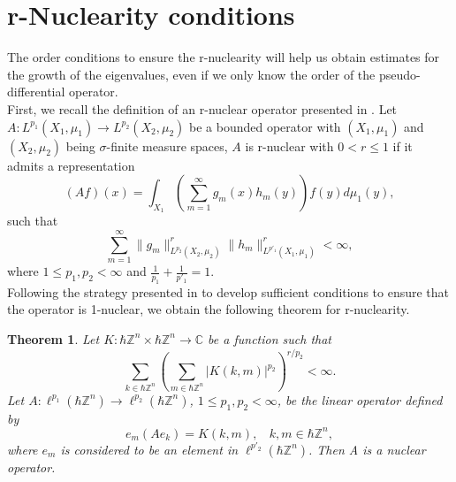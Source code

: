 \documentclass[pdflatex,sn-mathphys-num]{sn-jnl}%
\theoremstyle{thmstyleone}%
\newtheorem{theorem}{Theorem}
\theoremstyle{thmstyletwo}%
\theoremstyle{thmstylethree}%
\begin{document}
\section{r-Nuclearity conditions}\label{section nuclear}
The order conditions to ensure the r-nuclearity will help us obtain estimates for the growth of the eigenvalues, even if we only know the order of the pseudo-differential operator. \\
First, we recall the definition of an r-nuclear operator presented in \cite{delgado2015r}. Let $A:L^{p_1}(X_1,\mu_1)\to L^{p_2}(X_2,\mu_2)$ be a bounded operator with $(X_1,\mu_1)$ and $(X_2,\mu_2)$ being $\sigma$-finite measure spaces, $A$ is r-nuclear with $0<r\leq 1$ if it admits a representation 
\begin{equation}
    (Af)(x)=\int_{X_1}\left(\sum_{m=1}^{\infty} g_m(x)h_m(y) \right)f(y)d\mu_1(y), 
\end{equation}
such that 
\begin{equation}
    \sum_{m=1}^{\infty} \|g_m\|^r_{L^{p_2}(X_2,\mu_2)} \|h_m\|^r_{L^{p'_1}(X_1,\mu_1)}<\infty,
\end{equation}
where $1\leq p_1,p_2<\infty$ and $\frac{1}{p_1}+\frac{1}{p'_1}=1$.\\
\indent Following the strategy presented in \cite{delgado2013p} to develop sufficient conditions to ensure that the operator is 1-nuclear, we obtain the following theorem for r-nuclearity. 
\begin{theorem}
    Let $K:\hbar\mathbb{Z}^n\times \hbar\mathbb{Z}^n\to \mathbb{C}$ be a function such that 
    \[\sum_{k\in\hbar\mathbb{Z}^n}\left(\sum_{m\in\hbar\mathbb{Z}^n} |K(k,m)|^{p_2} \right)^{r/p_2} <\infty. \]
    Let $A:\ell^{p_1}(\hbar\mathbb{Z}^n)\to\ell^{p_2}(\hbar\mathbb{Z}^n)$, $1\leq p_1,p_2<\infty$, be the linear operator defined by 
    \[e_m(Ae_k)=K(k,m), \ \ \ \  k,m\in\hbar\mathbb{Z}^n,\]
    where $e_m$ is considered to be an element in $\ell^{p'_2}(\hbar\mathbb{Z}^n)$. Then A is a nuclear operator.
\end{theorem}
\end{document}
